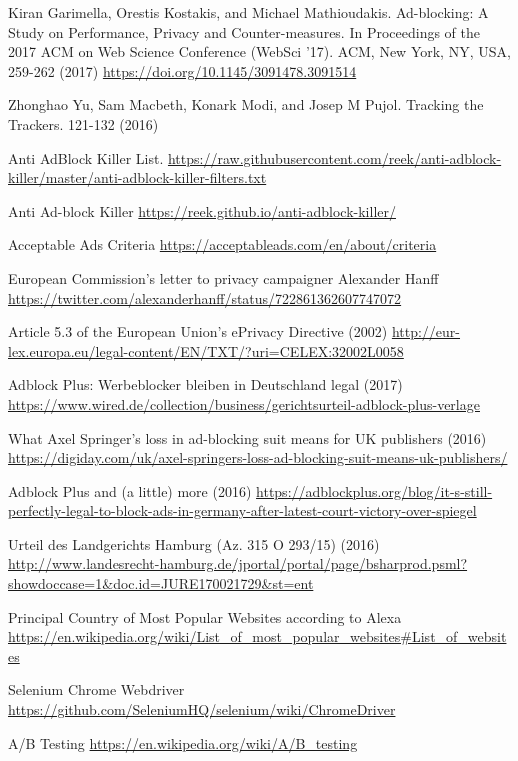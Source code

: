 \documentclass[runningheads,a4paper]{llncs}
\begin{document}
\begin{thebibliography}{x}
 Kiran Garimella, Orestis Kostakis, and Michael Mathioudakis. Ad-blocking: A Study on Performance, Privacy and Counter-measures. In Proceedings of the 2017 ACM on Web Science Conference (WebSci '17). ACM, New York, NY, USA, 259-262 (2017) \url{https://doi.org/10.1145/3091478.3091514}

 Zhonghao Yu, Sam Macbeth, Konark Modi, and Josep M Pujol. Tracking the Trackers. 121-132 (2016)

 Anti AdBlock Killer List. \url{https://raw.githubusercontent.com/reek/anti-adblock-killer/master/anti-adblock-killer-filters.txt}

 Anti Ad-block Killer \url{https://reek.github.io/anti-adblock-killer/}

 Acceptable Ads Criteria
\url{https://acceptableads.com/en/about/criteria}

 European Commission's letter to privacy campaigner Alexander Hanff
\url{https://twitter.com/alexanderhanff/status/722861362607747072}

 Article 5.3 of the European Union's ePrivacy Directive (2002)
\url{http://eur-lex.europa.eu/legal-content/EN/TXT/?uri=CELEX:32002L0058}

 Adblock Plus: Werbeblocker bleiben in Deutschland legal (2017)
\url{https://www.wired.de/collection/business/gerichtsurteil-adblock-plus-verlage}

 What Axel Springer’s loss in ad-blocking suit means for UK publishers (2016)
\url{https://digiday.com/uk/axel-springers-loss-ad-blocking-suit-means-uk-publishers/}

 Adblock Plus and (a little) more (2016)
\url{https://adblockplus.org/blog/it-s-still-perfectly-legal-to-block-ads-in-germany-after-latest-court-victory-over-spiegel}

 Urteil des Landgerichts Hamburg (Az. 315 O 293/15) (2016)
\url{http://www.landesrecht-hamburg.de/jportal/portal/page/bsharprod.psml?showdoccase=1&doc.id=JURE170021729&st=ent}

 Principal Country of Most Popular Websites according to Alexa
\url{https://en.wikipedia.org/wiki/List_of_most_popular_websites#List_of_websites}

 Selenium Chrome Webdriver
\url{https://github.com/SeleniumHQ/selenium/wiki/ChromeDriver}

 A/B Testing
\url{https://en.wikipedia.org/wiki/A/B_testing}

\end{thebibliography}
\end{document}
